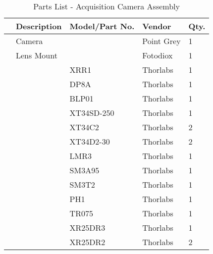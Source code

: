 \begin{table}[htbp]
    \renewcommand{\arraystretch}{1.25}
    \caption{Parts List - Acquisition Camera Assembly}
    \begin{center}
        \begin{tabular}{ l l l l l }
        \toprule[2pt]
        \textbf{} & \textbf{Description} & \textbf{Model/Part No.}  & \textbf{Vendor} & \textbf{Qty.} \\
        \midrule[0.75pt]
        & Camera &  & Point Grey & 1 \\
        & Lens Mount &  & Fotodiox & 1 \\
        &  & XRR1 & Thorlabs & 1 \\
        &  & DP8A & Thorlabs & 1 \\
        &  & BLP01 & Thorlabs & 1 \\
        &  & XT34SD-250 & Thorlabs & 1 \\
        &  & XT34C2 & Thorlabs & 2 \\
        &  & XT34D2-30 & Thorlabs & 2 \\
        &  & LMR3 & Thorlabs & 1 \\
        &  & SM3A95 & Thorlabs & 1 \\
        &  & SM3T2 & Thorlabs & 1 \\
        &  & PH1 & Thorlabs & 1 \\
        &  & TR075 & Thorlabs & 1 \\
        &  & XR25DR3 & Thorlabs & 1 \\
        &  & XR25DR2 & Thorlabs & 2 \\
        \bottomrule[2pt]
        \end{tabular}
        \label{tab:parts_list_acq_assy}
    \end{center}
\end{table}

